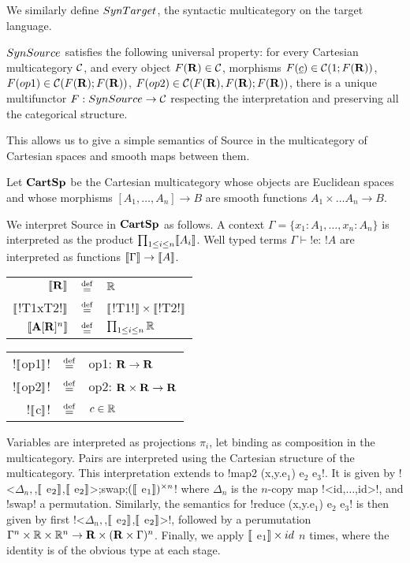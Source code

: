 We similarly define $SynTarget$, the syntactic multicategory on the target language.

$SynSource$ satisfies the following universal property: 
for every Cartesian multicategory $\mathcal{C}$,
and every object $F(\mathbf{R})\in\mathcal{C}$, morphisms $F(\underline{c})\in\mathcal{C}(1;F(\mathbf{R}))$, 
$F(op1)\in\mathcal{C}(F(\mathbf{R});F(\mathbf{R}))$, $F(op2)\in\mathcal{C}(F(\mathbf{R}),F(\mathbf{R});F(\mathbf{R}))$, 
there is a unique multifunctor $F:SynSource\to\mathcal{C}$ respecting the interpretation and preserving all the categorical structure. 

This allows us to give a simple semantics of Source 
in the multicategory of Cartesian spaces and smooth maps between them. 

\begin{definition}[$\CartSp$]
Let $\CartSp$ be the Cartesian multicategory whose objects are Euclidean spaces
and whose morphisms $[A_1,\ldots,A_n]\to B$ are smooth functions $A_1\times\ldots A_n \to B$.

We interpret Source in $\CartSp$ as follows. A context $\Gamma=\{x_1:A_1,\ldots,x_n:A_n\}$ is interpreted as the product $\prod_{1\leq i \leq n}\llbracket A_i\rrbracket$.
Well typed terms $\Gamma\vdash$!e: !$A$ are interpreted as functions $\llbracket \Gamma\rrbracket\to\llbracket A\rrbracket$.

    \begin{tabular}{r c l}
    $\llbracket \mathbf{R} \rrbracket$ & $\stackrel {\mathrm{def}}=$& $\mathbb{R}$ \\
    $\llbracket$!T1xT2!$\rrbracket$ & $\stackrel {\mathrm{def}}=$& $\llbracket$!T1!$\rrbracket \times\llbracket$!T2!$\rrbracket$ \\
    $\llbracket \mathbf{A}[\mathbf{R}]^{n}\rrbracket$ & $\stackrel {\mathrm{def}}=$ & $\prod_{1\leq i \leq n} \mathbb{R}$ \\
    \end{tabular}
    \begin{tabular}{r c l} 
        !$\llbracket$op1$\rrbracket$! & $\stackrel {\mathrm{def}}=$ & op1: $\mathbf{R}\to\mathbf{R}$ \\
        !$\llbracket$op2$\rrbracket$! & $\stackrel {\mathrm{def}}=$ & op2: $\mathbf{R}\times \mathbf{R}\to\mathbf{R}$ \\
        !$\llbracket$c$\rrbracket$! & $\stackrel {\mathrm{def}}=$ & $c\in\mathbb{R}$ \\
    \end{tabular}

Variables are interpreted as projections $\pi_i$, let binding as composition in the multicategory. 
Pairs are interpreted using the Cartesian structure of the multicategory.
This interpretation extends to !map2 (x,y.e$_1$) e$_2$ e$_3$!. It is given by
!<$\Delta_n,$,$\llbracket$ e$_2\rrbracket$,$\llbracket$ e$_2\rrbracket$>;swap;$(\llbracket$ e$_1\rrbracket)^{\times n}$!
where $\Delta_n$ is the $n$-copy map !<id,$\ldots$,id>!, and !swap! a permutation.
Similarly, the semantics for !reduce (x,y.e$_1$) e$_2$ e$_3$! is then given by first !<$\Delta_n,$,$\llbracket$ e$_2\rrbracket$,$\llbracket$ e$_2\rrbracket$>!, followed by a perumutation $\Gamma^n \times \mathbb{R} \times \mathbb{R}^n \to \mathbf{R} \times (\mathbf{R} \times \Gamma)^n$. 
Finally, we apply $\llbracket$ e$_1\rrbracket \times id$ $n$ times, where the identity is of the obvious type at each stage.
\end{definition}

